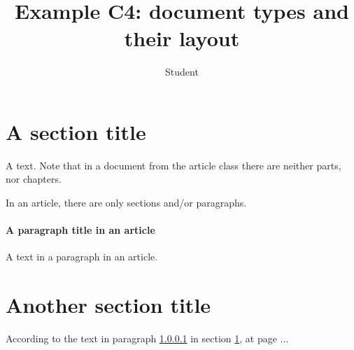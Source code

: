 \documentclass{article}
\title{Example C4: document types and their layout}
\author{Student}
\begin{document}
\maketitle
\tableofcontents
\section{A section title}\label{sec:et}
A text. Note that in a document from the article class there are neither parts, nor chapters.\par 
In an article, there are only sections and/or paragraphs.
\paragraph{A paragraph title in an article}\label{par:et}
A text in a paragraph in an article.  
\section{Another section title}
According to the text in paragraph \ref{par:et} in section \ref{sec:et}, at page \pageref{sec:et}... 
\end{document}
